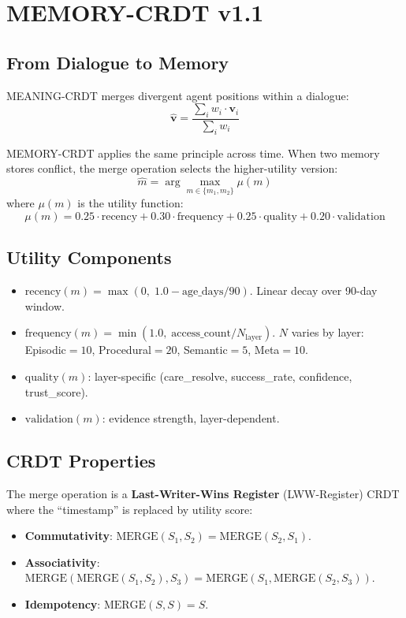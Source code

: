 \documentclass[11pt,a4paper]{article}
\begin{document}
\section{MEMORY-CRDT v1.1}\label{sec:crdt}

\subsection{From Dialogue to Memory}

MEANING-CRDT merges divergent agent positions within a dialogue:
\[
  \hat{\mathbf{v}} = \frac{\sum_{i} w_i \cdot \mathbf{v}_i}
                          {\sum_{i} w_i}
\]

MEMORY-CRDT applies the same principle across time.  When two memory
stores conflict, the merge operation selects the higher-utility version:
\[
  \hat{m} = \arg\max_{m \in \{m_1, m_2\}} \mu(m)
\]
where $\mu(m)$ is the utility function:
\[
  \mu(m) = 0.25 \cdot \text{recency} + 0.30 \cdot \text{frequency}
         + 0.25 \cdot \text{quality} + 0.20 \cdot \text{validation}
\]

\subsection{Utility Components}

\begin{itemize}
  \item $\text{recency}(m) = \max(0,\; 1.0 - \text{age\_days}/90)$.
    Linear decay over 90-day window.
  \item $\text{frequency}(m) = \min(1.0,\;
    \text{access\_count}/N_{\text{layer}})$.
    $N$ varies by layer: Episodic${}=10$, Procedural${}=20$,
    Semantic${}=5$, Meta${}=10$.
  \item $\text{quality}(m)$: layer-specific (care\_resolve, success\_rate,
    confidence, trust\_score).
  \item $\text{validation}(m)$: evidence strength, layer-dependent.
\end{itemize}

\subsection{CRDT Properties}

\begin{theorembox}
The merge operation is a \textbf{Last-Writer-Wins Register}
(LWW-Register) CRDT where the ``timestamp'' is replaced by utility
score:
\begin{itemize}
  \item \textbf{Commutativity}: $\text{MERGE}(S_1, S_2) =
    \text{MERGE}(S_2, S_1)$.
  \item \textbf{Associativity}: $\text{MERGE}(\text{MERGE}(S_1, S_2),
    S_3) = \text{MERGE}(S_1, \text{MERGE}(S_2, S_3))$.
  \item \textbf{Idempotency}: $\text{MERGE}(S, S) = S$.
\end{itemize}
\end{theorembox}
\end{document}
